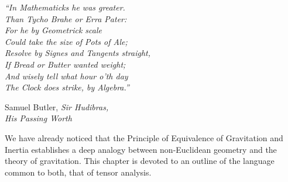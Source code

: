 
\begin{flushright}
\begin{minipage}{0.56\textwidth}
\itshape
``In Mathematicks he was greater.\\
Than Tycho Brahe or Erra Pater:\\
For he by Geometrick scale\\
Could take the size of Pots of Ale;\\
Resolve by Signes and Tangents straight,\\
If Bread or Butter wanted weight;\\
And wisely tell what hour o’th day\\
The Clock does strike, by Algebra.''

\medskip
\upshape
Samuel Butler, \textit{Sir Hudibras,\\
His Passing Worth}
\end{minipage}
\end{flushright}

We have already noticed that the Principle of Equivalence of Gravitation and
Inertia establishes a deep analogy between non-Euclidean geometry and the
theory of gravitation. This chapter is devoted to an outline of the language
common to both, that of tensor analysis.
